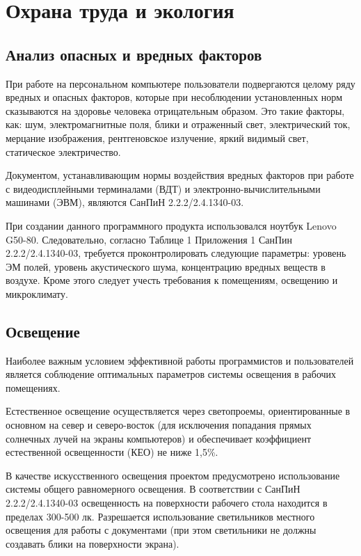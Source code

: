 \chapter{Охрана труда и экология}


\section{Анализ опасных и вредных факторов}
При работе на персональном компьютере пользователи подвергаются целому ряду вредных и опасных факторов, которые при несоблюдении установленных норм сказываются на здоровье человека отрицательным образом. Это такие факторы, как: шум, электромагнитные поля, блики и отраженный свет, электрический ток, мерцание изображения, рентгеновское излучение, яркий видимый свет, статическое электричество.

Документом, устанавливающим нормы воздействия вредных факторов при работе с видеодисплейными терминалами (ВДТ) и электронно-вычислительными машинами (ЭВМ), являются СанПиН 2.2.2/2.4.1340-03.

При создании данного программного  продукта использовался ноутбук Lenovo G50-80. Следовательно, согласно Таблице 1 Приложения 1 СанПин 2.2.2/2.4.1340-03, требуется проконтролировать следующие параметры: уровень ЭМ полей, уровень акустического шума, концентрацию вредных веществ в воздухе. Кроме этого следует учесть требования к помещениям, освещению и микроклимату.


\section{Освещение}
Наиболее важным условием эффективной работы программистов и пользователей является соблюдение оптимальных параметров системы освещения в рабочих помещениях.

Естественное освещение осуществляется через светопроемы, ориентированные в основном на север и северо-восток (для исключения попадания прямых солнечных лучей на экраны компьютеров) и обеспечивает коэффициент естественной освещенности (КЕО) не ниже 1,5\%.

В качестве искусственного освещения проектом предусмотрено использование системы общего равномерного освещения. В соответствии с СанПиН 2.2.2/2.4.1340-03 освещенность на поверхности рабочего стола находится в пределах 300-500 лк. Разрешается использование светильников местного освещения для работы с документами (при этом светильники не должны создавать блики на поверхности экрана).

